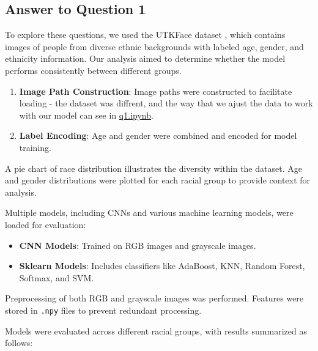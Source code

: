 \documentclass{article}
\begin{document}
\subsection*{Answer to Question 1}  
To explore these questions, we used the UTKFace dataset \cite{UTKFace_dataset}, which contains images of people from diverse ethnic backgrounds with labeled age, gender, and ethnicity information. 
Our analysis aimed to determine whether the model performs consistently between different groups.

\begin{enumerate}
    \item \textbf{Image Path Construction}: Image paths were constructed to facilitate loading - the dataset was diffrent, and the way that we ajust the data to work with our model can see in \href{https://github.com/ShayGali/VisAge/blob/main/questions/q1.ipynb}{q1.ipynb}.
    \item \textbf{Label Encoding}: Age and gender were combined and encoded for model training.
\end{enumerate}

A pie chart of race distribution illustrates the diversity within the dataset. Age and gender distributions were plotted for each racial group to provide context for analysis.

Multiple models, including CNNs and various machine learning models, were loaded for evaluation:
\begin{itemize}
    \item \textbf{CNN Models}: Trained on RGB images and grayscale images.
    \item \textbf{Sklearn Models}: Includes classifiers like AdaBoost, KNN, Random Forest, Softmax, and SVM.
\end{itemize}

Preprocessing of both RGB and grayscale images was performed. Features were stored in \texttt{.npy} files to prevent redundant processing.

Models were evaluated across different racial groups, with results summarized as follows:
\end{document}
